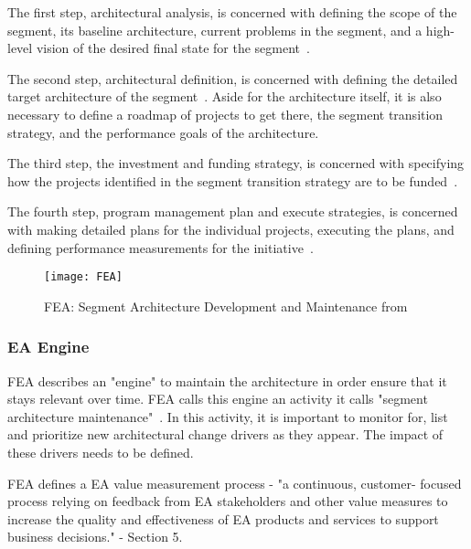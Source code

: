 The first step, architectural analysis, is concerned with defining the scope of the segment, its baseline architecture, current problems in the segment, and a high-level vision of the desired final state for the segment~\cite{FEA_PMO2007}.

The second step, architectural definition, is concerned with defining the detailed target architecture of the segment~\cite{FEA_PMO2007}. Aside for the architecture itself, it is also necessary to define a roadmap of projects to get there, the segment transition strategy, and the performance goals of the architecture. 
  
The third step, the investment and funding strategy, is concerned with specifying how the projects identified in the segment transition strategy are to be funded~\cite{FEA_PMO2007}. 

The fourth step, program management plan and execute strategies, is concerned with making detailed plans for the individual projects, executing the plans, and defining performance measurements for the initiative~\cite{FEA_PMO2007}.
\begin{figure}
\centering
\texttt{[image: FEA]}
\caption{FEA: Segment Architecture Development and Maintenance from ~\cite{FEA_PMO2007}}
\label{fig:FEA_segmentDev}
\end{figure}

    
\subsubsection{EA Engine}

FEA describes an "engine" to maintain the architecture in order ensure that it stays relevant over time. FEA calls this engine an activity it calls "segment architecture maintenance"~\cite{FEA_PMO2007}. In this activity, it is important to monitor for, list and prioritize new architectural change drivers as they appear. The impact of these drivers needs to be defined. 


FEA  defines  a EA value measurement process -  "a continuous, customer- focused process relying on feedback from EA stakeholders and other value measures to increase the quality and effectiveness of EA products and services to support business decisions." \cite{FEA_PMO2007} - Section 5.

